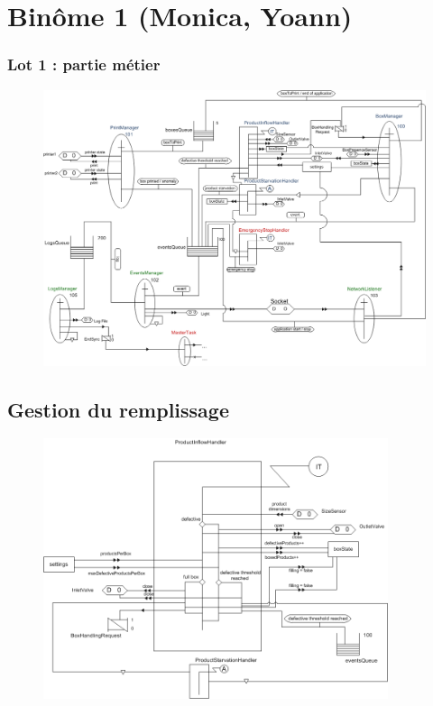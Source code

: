 \documentclass{beamer}
\begin{document}
\section{Binôme 1 (Monica, Yoann)}
	\begin{frame}
        \frametitle{Lot 1 : partie métier}
        \begin{figure}
	        \centering
	        \includegraphics[height=0.8\textheight]{../../SchemasLCG/schemaGlobal.png}
        \end{figure}
	\end{frame}

    \subsection{Gestion du remplissage}
	\begin{frame}
	    \begin{figure}
		    \centering
		    \includegraphics[width=0.9\textwidth]{../../SchemasLCG/ProductInflowHandler.png}
	    \end{figure}
	\end{frame}
\end{document}
